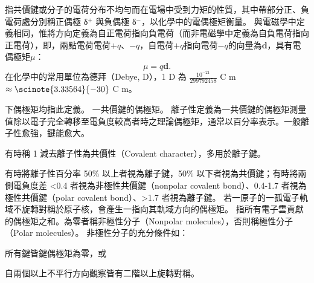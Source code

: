 \documentclass[a4paper,12pt]{report}
\begin{document}
指共價鍵或分子的電荷分布不均勻而在電場中受到力矩的性質，其中帶部分正、負電荷處分別稱正偶極 δ$^+$ 與負偶極 δ$^-$，以化學中的電偶極矩衡量。
與電磁學中定義相同，惟將方向定義為自正電荷指向負電荷（而非電磁學中定義為自負電荷指向正電荷），即，兩點電荷電荷$+q$、$-q$，自電荷$+q$指向電荷$-q$的向量為$\mathbf{d}$，具有電偶極矩$\mu$：
\[\mu=q\mathbf{d}.\]
在化學中的常用單位為德拜（Debye, D），1 D 為 $\frac{10^{-21}}{299792458}$ C m $\approx\scinote{3.33564}{-30}$ C m。

下偶極矩均指此定義。
一共價鍵的偶極矩。
離子性定義為一共價鍵的偶極矩測量值除以電子完全轉移至電負度較高者時之理論偶極矩，通常以百分率表示。一般離子性愈強，鍵能愈大。

有時稱 1 減去離子性為共價性（Covalent character），多用於離子鍵。

有時將離子性百分率 50\% 以上者視為離子鍵，50\% 以下者視為共價鍵；有時將兩側電負度差 <0.4 者視為非極性共價鍵（nonpolar covalent bond）、0.4-1.7 者視為極性共價鍵（polar covalent bond）、>1.7 者視為離子鍵。
若一原子的一孤電子軌域不旋轉對稱於原子核，會產生一指向其軌域方向的偶極矩。
指所有電子雲貢獻的偶極矩之和。為零者稱非極性分子（Nonpolar molecules），否則稱極性分子（Polar molecules）。
非極性分子的充分條件如：
\bit
\item 所有鍵皆鍵偶極矩為零，或
\item 自兩個以上不平行方向觀察皆有二階以上旋轉對稱。
\eit
\end{document}
